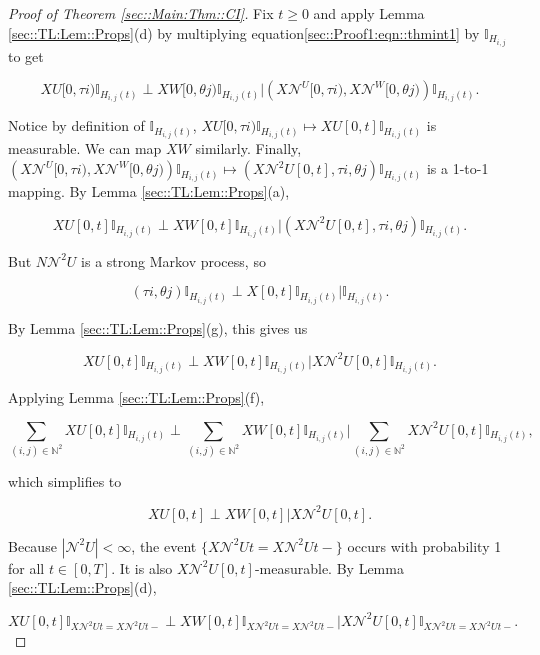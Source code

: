 \documentclass[12pt]{article}
\newcommand{\mb}{\mathbb}
\newcommand{\mc}{\mathcal}
\newcommand{\ind}{\hspace{24pt}}
\renewcommand{\U}{U}							%
\newcommand{\UU}{W}								%
\newcommand{\T}{T}								%
\renewcommand{\t}{t}							%
\newcommand{\X}{X}								%
\newcommand{\neigh}{\mc{N}}						%
\newcommand{\dneigh}{\mc{N}^2}					%
\newcommand{\vind}[1]{^{#1}}					%
\newcommand{\poiss}{N}							%
\newcommand{\rt}{\tau}							%
\newcommand{\rtt}{\theta}						%
\newcommand{\pathseted}[2]{H_{#1,#2}}			%
\begin{document}
\begin{proof}[Proof of Theorem \ref{sec::Main:Thm::CI}]
\ind Fix \(\t \geq 0\) and apply Lemma \ref{sec::TL:Lem::Props}(d) by multiplying equation\eqref{sec::Proof1:eqn::thmint1} by \(\mb{I}_{\pathseted{i}{j}}\) to get

\[\X{\U}{[0,\rt{i})}\mb{I}_{\pathseted{i}{j}(\t)}\perp\X{\UU}{[0,\rtt{j})}\mb{I}_{\pathseted{i}{j}(\t)}\big|\left(\X{\neigh\vind{\U}}{[0,\rt{i})},\X{\neigh\vind{\UU}}{[0,\rtt{j})}\right)\mb{I}_{\pathseted{i}{j}(\t)}.\]


Notice by definition of \(\mb{I}_{\pathseted{i}{j}(\t)}\), \(\X{\U}{[0,\rt{i})}\mb{I}_{\pathseted{i}{j}(\t)} \mapsto \X{\U}{[0,\t]}\mb{I}_{\pathseted{i}{j}(\t)}\) is measurable. We can map \(\X{\UU}{}\) similarly. Finally, \(\left(\X{\neigh\vind{\U}}{[0,\rt{i})},\X{\neigh\vind{\UU}}{[0,\rtt{j})}\right)\mb{I}_{\pathseted{i}{j}(\t)}\mapsto (\X{\dneigh{\U}}{[0,\t]}, \rt{i},\rtt{j})\mb{I}_{\pathseted{i}{j}(\t)}\) is a 1-to-1 mapping. By Lemma \ref{sec::TL:Lem::Props}(a),

\[\X{\U}{[0,\t]}\mb{I}_{\pathseted{i}{j}(\t)}\perp\X{\UU}{[0,\t]}\mb{I}_{\pathseted{i}{j}(\t)}\big|\left(\X{\dneigh{\U}}{[0,\t]},\rt{i},\rtt{j}\right)\mb{I}_{\pathseted{i}{j}(\t)}.\]

But \(\poiss{\dneigh{\U}}\) is a strong Markov process, so 

\[(\rt{i},\rtt{j})\mb{I}_{\pathseted{i}{j}(\t)}\perp \X{}{[0,\t]}\mb{I}_{\pathseted{i}{j}(\t)}|\mb{I}_{\pathseted{i}{j}(\t)}.\]

By Lemma \ref{sec::TL:Lem::Props}(g), this gives us

\[\X{\U}{[0,\t]}\mb{I}_{\pathseted{i}{j}(\t)}\perp\X{\UU}{[0,\t]}\mb{I}_{\pathseted{i}{j}(\t)}\big|\X{\dneigh{\U}}{[0,\t]}\mb{I}_{\pathseted{i}{j}(\t)}.\]

Applying Lemma \ref{sec::TL:Lem::Props}(f),

\[\sum_{(i,j)\in\mb{N}^2}\X{\U}{[0,\t]}\mb{I}_{\pathseted{i}{j}(\t)}\perp\sum_{(i,j)\in\mb{N}^2}\X{\UU}{[0,\t]}\mb{I}_{\pathseted{i}{j}(\t)}\bigg|\sum_{(i,j)\in\mb{N}^2}\X{\dneigh{\U}}{[0,\t]}\mb{I}_{\pathseted{i}{j}(\t)},\]

which simplifies to 

\[\X{\U}{[0,\t]}\perp\X{\UU}{[0,\t]}\big|\X{\dneigh{\U}}{[0,\t]}.\]

Because \(|\dneigh{\U}| < \infty\), the event \(\{\X{\dneigh{\U}}{\t} = \X{\dneigh{\U}}{\t-}\}\) occurs with probability 1 for all \(\t \in [0,\T]\). It is also \(\X{\dneigh{\U}}{[0,\t]}\)-measurable. By Lemma \ref{sec::TL:Lem::Props}(d),

\[\X{\U}{[0,\t]}\mb{I}_{\X{\dneigh{\U}}{\t} = \X{\dneigh{\U}}{\t-}}\perp\X{\UU}{[0,\t]}\mb{I}_{\X{\dneigh{\U}}{\t} = \X{\dneigh{\U}}{\t-}}\big|\X{\dneigh{\U}}{[0,\t]}\mb{I}_{\X{\dneigh{\U}}{\t} = \X{\dneigh{\U}}{\t-}}.\]


\end{proof}
\end{document}
